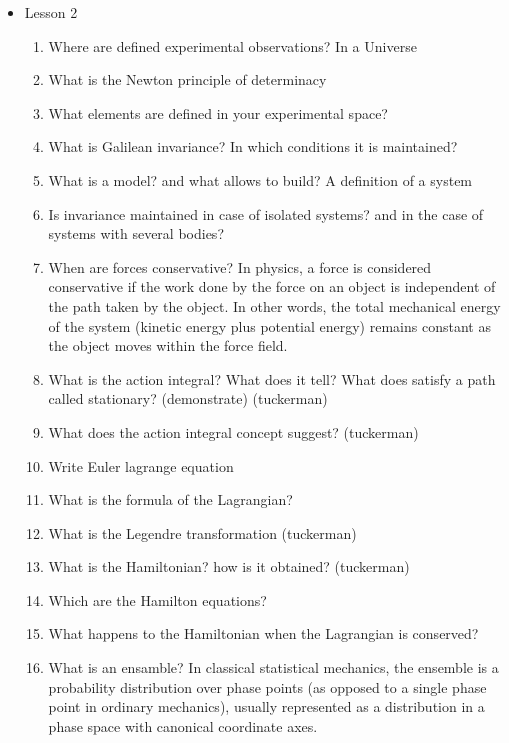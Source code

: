 {\begin{itemize}
\begin{enumerate}
        \item What is the Ising model? How can you describe with it the critical point?
        \item What is necessary to make Multiscale methods relevant? (hierarchy) The use of a mapping function
        \item What procedure allows the coarse-graining?
    \end{enumerate}
    \item Lesson 2
    \begin{enumerate}
    	\item Where are defined experimental observations? In a Universe
        \item What is the Newton principle of determinacy
        \item What elements are defined in your experimental space?
        \item What is Galilean invariance? In which conditions it is maintained?
        \item What is a model? and what allows to build? A definition of a system
        \item Is invariance maintained in case of isolated systems? and in the case of systems with several bodies?
        \item When are forces conservative? In physics, a force is considered conservative if the work done by the force on an object is independent of the path taken by the object. In other words, the total mechanical energy of the system (kinetic energy plus potential energy) remains constant as the object moves within the force field.
        \item What is the action integral? What does it tell? What does satisfy a path called stationary? (demonstrate) (tuckerman)
        \item What does the action integral concept suggest? (tuckerman)
        \item Write Euler lagrange equation
        \item What is the formula of the Lagrangian?
        \item What is the Legendre transformation (tuckerman)
        \item What is the Hamiltonian? how is it obtained? (tuckerman)
        \item Which are the Hamilton equations?
        \item What happens to the Hamiltonian when the Lagrangian is conserved?
        \item What is an ensamble? In classical statistical mechanics, the ensemble is a probability distribution over phase points (as opposed to a single phase point in ordinary mechanics), usually represented as a distribution in a phase space with canonical coordinate axes.

\end{enumerate}
\end{itemize}}
